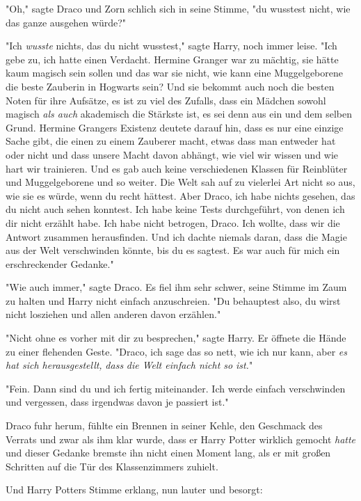 {"Oh," sagte Draco und Zorn schlich sich in seine Stimme, "du wusstest nicht, wie das ganze ausgehen würde?"

"Ich \emph{wusste} nichts, das du nicht wusstest," sagte Harry, noch immer leise. "Ich gebe zu, ich hatte einen Verdacht. Hermine Granger war zu mächtig, sie hätte kaum magisch sein sollen und das war sie nicht, wie kann eine Muggelgeborene die beste Zauberin in Hogwarts sein? Und sie bekommt auch noch die besten Noten für ihre Aufsätze, es ist zu viel des Zufalls, dass ein Mädchen sowohl magisch \emph{als auch} akademisch die Stärkste ist, es sei denn aus ein und dem selben Grund. Hermine Grangers Existenz deutete darauf hin, dass es nur eine einzige Sache gibt, die einen zu einem Zauberer macht, etwas dass man entweder hat oder nicht und dass unsere Macht davon abhängt, wie viel wir wissen und wie hart wir trainieren. Und es gab auch keine verschiedenen Klassen für Reinblüter und Muggelgeborene und so weiter. Die Welt sah auf zu vielerlei Art nicht so aus, wie sie es würde, wenn du recht hättest. Aber Draco, ich habe nichts gesehen, das du nicht auch sehen konntest. Ich habe keine Tests durchgeführt, von denen ich dir nicht erzählt habe. Ich habe nicht betrogen, Draco. Ich wollte, dass wir die Antwort zusammen herausfinden. Und ich dachte niemals daran, dass die Magie aus der Welt verschwinden könnte, bis du es sagtest. Es war auch für mich ein erschreckender Gedanke."

"Wie auch immer," sagte Draco. Es fiel ihm sehr schwer, seine Stimme im Zaum zu halten und Harry nicht einfach anzuschreien. "Du behauptest also, du wirst nicht losziehen und allen anderen davon erzählen."

"Nicht ohne es vorher mit dir zu besprechen," sagte Harry. Er öffnete die Hände zu einer flehenden Geste. "Draco, ich sage das so nett, wie ich nur kann, aber \emph{es hat sich herausgestellt,} \emph{dass} \emph{die Welt einfach nicht so} \emph{ist.}"

"Fein. Dann sind du und ich fertig miteinander. Ich werde einfach verschwinden und vergessen, dass irgendwas davon je passiert ist."

Draco fuhr herum, fühlte ein Brennen in seiner Kehle, den Geschmack des Verrats und zwar als ihm klar wurde, dass er Harry Potter wirklich gemocht \emph{hatte} und dieser Gedanke bremste ihn nicht einen Moment lang, als er mit großen Schritten auf die Tür des Klassenzimmers zuhielt.

Und Harry Potters Stimme erklang, nun lauter und besorgt:

}
